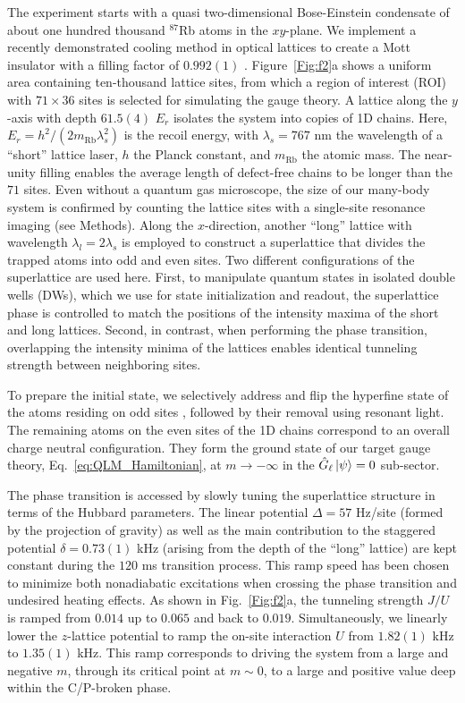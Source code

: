 \documentclass[aps,prl,twocolumn,superscriptaddress,footinbib,linenumbers]{revtex4}
\begin{document}
The experiment starts with a quasi two-dimensional Bose-Einstein condensate of about one hundred thousand $^{87}$Rb atoms in the $xy$-plane. We implement a recently demonstrated cooling method in optical lattices to create a Mott insulator with a filling factor of $0.992(1)$ \cite{Yang:2019}. Figure~\ref{Fig:f2}a shows a uniform area containing ten-thousand lattice sites, from which a region of interest (ROI) with $71\times36$ sites is selected for simulating the gauge theory. A lattice along the $y$-axis with depth $61.5(4)$ $E_r$ isolates the system into copies of 1D chains. Here, $E_r = h^2/(2 m_{\text{Rb}} \lambda_s^2)$ is the recoil energy, with $\lambda_s = 767$ nm the wavelength of a ``short'' lattice laser, $h$ the Planck constant, and $m_{\text{Rb}}$ the atomic mass. The near-unity filling enables the average length of defect-free chains to be longer than the $71$ sites. Even without a quantum gas microscope, the size of our many-body system is confirmed by counting the lattice sites with a single-site resonance imaging (see Methods). Along the $x$-direction, another ``long'' lattice with wavelength $\lambda_l=2\lambda_s$ is employed to construct a superlattice that divides the trapped atoms into odd and even sites. Two different configurations of the superlattice are used here. First, to manipulate quantum states in isolated double wells (DWs), which we use for state initialization and readout, the superlattice phase is controlled to match the positions of the intensity maxima of the short and long lattices. Second, in contrast, when performing the phase transition, overlapping the intensity minima of the lattices enables identical tunneling strength between neighboring sites.

To prepare the initial state, we selectively address and flip the hyperfine state of the atoms residing on odd sites \cite{Yang:2019}, followed by their removal using resonant light. The remaining atoms on the even sites of the 1D chains correspond to an overall charge neutral configuration. They form the ground state of our target gauge theory, Eq.~\eqref{eq:QLM_Hamiltonian}, at $m\rightarrow -\infty$ in the $\hat{G}_{\ell}\ket{\psi}=0$ sub-sector.

The phase transition is accessed by slowly tuning the superlattice structure in terms of the Hubbard parameters. The linear potential $\Delta = 57$ Hz/site (formed by the projection of gravity) as well as the main contribution to the staggered potential $\delta = 0.73(1)$ kHz (arising from the depth of the ``long'' lattice) are kept constant during the $120$ ms transition process. This ramp speed has been chosen to minimize both nonadiabatic excitations when crossing the phase transition and undesired heating effects. As shown in Fig.~\ref{Fig:f2}a, the tunneling strength $J/U$ is ramped from $0.014$ up to $0.065$ and back to $0.019$. Simultaneously, we linearly lower the $z$-lattice potential to ramp the on-site interaction $U$ from $1.82(1)$ kHz to $1.35(1)$ kHz. This ramp corresponds to driving the system from a large and negative $m$, through its critical point at $m \sim 0$, to a large and positive value deep within the C/P-broken phase.
\end{document}
